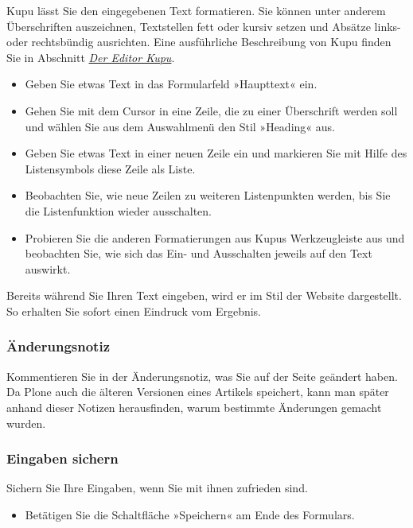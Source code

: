 \documentclass[a4paper,12pt,ngerman]{manual}
\begin{document}
Kupu lässt Sie den eingegebenen Text formatieren. Sie können unter anderem
Überschriften auszeichnen, Textstellen fett oder kursiv setzen und Absätze
links- oder rechtsbündig ausrichten. Eine ausführliche Beschreibung von Kupu
finden Sie in Abschnitt \hyperlink{sec-kupu}{\emph{Der Editor Kupu}}.
\begin{itemize}
\item {} 
Geben Sie etwas Text in das Formularfeld »Haupttext« ein.

\item {} 
Gehen Sie mit dem Cursor in eine Zeile, die zu einer Überschrift werden
soll und wählen Sie aus dem Auswahlmenü den Stil »Heading« aus.

\item {} 
Geben Sie etwas Text in einer neuen Zeile ein und markieren Sie mit Hilfe
des Listensymbols diese Zeile als Liste.

\item {} 
Beobachten Sie, wie neue Zeilen zu weiteren Listenpunkten werden, bis
Sie die Listenfunktion wieder ausschalten.

\item {} 
Probieren Sie die anderen Formatierungen aus Kupus Werkzeugleiste aus
und beobachten Sie, wie sich das Ein- und Ausschalten jeweils auf den Text
auswirkt.

\end{itemize}

Bereits während Sie Ihren Text eingeben, wird er im Stil der Website
dargestellt. So erhalten Sie sofort einen Eindruck vom Ergebnis.


\subsubsection{Änderungsnotiz}

Kommentieren Sie in der Änderungsnotiz, was Sie auf der Seite geändert haben.
Da Plone auch die älteren Versionen eines Artikels speichert, kann man später
anhand dieser Notizen herausfinden, warum bestimmte Änderungen gemacht wurden.


\subsubsection{Eingaben sichern}

Sichern Sie Ihre Eingaben, wenn Sie mit ihnen zufrieden sind.
\begin{itemize}
\item {} 
Betätigen Sie die Schaltfläche »Speichern« am Ende des
Formulars.

\end{itemize}
\end{document}
